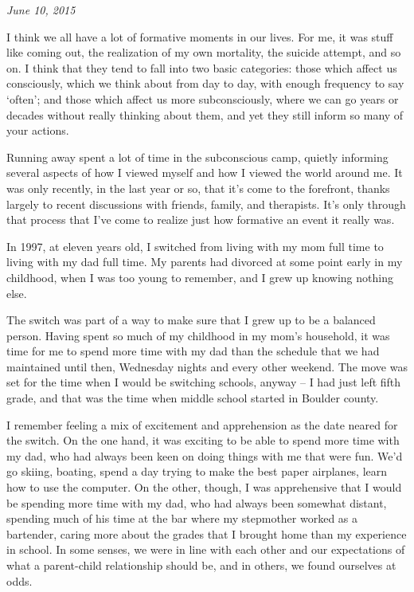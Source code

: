 \begin{paracol}{2}
  \begin{rightcolumn*}
    \begin{flushright}
\emph{June 10, 2015}
\end{flushright}
\end{rightcolumn*}
\begin{leftcolumn}
\noindent I think we all have a lot of formative moments in our lives. For me, it was stuff like coming out, the realization of my own mortality, the suicide attempt, and so on. I think that they tend to fall into two basic categories: those which affect us consciously, which we think about from day to day, with enough frequency to say `often'; and those which affect us more subconsciously, where we can go years or decades without really thinking about them, and yet they still inform so many of your actions.

Running away spent a lot of time in the subconscious camp, quietly informing several aspects of how I viewed myself and how I viewed the world around me. It was only recently, in the last year or so, that it's come to the forefront, thanks largely to recent discussions with friends, family, and therapists. It's only through that process that I've come to realize just how formative an event it really was.

In 1997, at eleven years old, I switched from living with my mom full time to living with my dad full time. My parents had divorced at some point early in my childhood, when I was too young to remember, and I grew up knowing nothing else.

The switch was part of a way to make sure that I grew up to be a balanced person. Having spent so much of my childhood in my mom's household, it was time for me to spend more time with my dad than the schedule that we had maintained until then, Wednesday nights and every other weekend. The move was set for the time when I would be switching schools, anyway -- I had just left fifth grade, and that was the time when middle school started in Boulder county.

I remember feeling a mix of excitement and apprehension as the date neared for the switch. On the one hand, it was exciting to be able to spend more time with my dad, who had always been keen on doing things with me that were fun. We'd go skiing, boating, spend a day trying to make the best paper airplanes, learn how to use the computer. On the other, though, I was apprehensive that I would be spending more time with my dad, who had always been somewhat distant, spending much of his time at the bar where my stepmother worked as a bartender, caring more about the grades that I brought home than my experience in school. In some senses, we were in line with each other and our expectations of what a parent-child relationship should be, and in others, we found ourselves at odds.


\end{leftcolumn}
\end{paracol}
